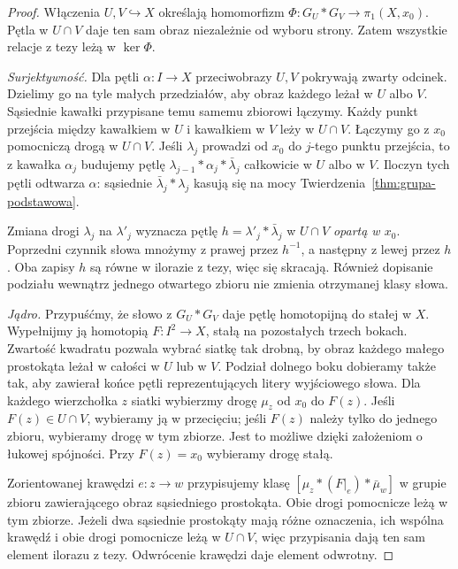 \documentclass[11pt,a4paper,oneside]{report}
\theoremstyle{plain}
\theoremstyle{definition}
\theoremstyle{remark}
\begin{document}
\begin{proof}
Włączenia $U,V\hookrightarrow X$
określają homomorfizm
$\Phi:G_U*G_V\to\pi_1(X,x_0)$.
Pętla w $U\cap V$ daje ten sam obraz
niezależnie od wyboru strony.
Zatem wszystkie relacje z tezy
leżą w $\ker\Phi$.

\emph{Surjektywność.} Dla pętli
$\alpha:I\to X$ przeciwobrazy $U,V$
pokrywają zwarty odcinek. Dzielimy
go na tyle małych przedziałów,
aby obraz każdego leżał w $U$ albo $V$.
Sąsiednie kawałki przypisane temu
samemu zbiorowi łączymy. Każdy
punkt przejścia między kawałkiem
w $U$ i kawałkiem w $V$ leży w
$U\cap V$. Łączymy go z $x_0$
pomocniczą drogą w $U\cap V$.
Jeśli $\lambda_j$ prowadzi od $x_0$
do $j$-tego punktu przejścia,
to z kawałka $\alpha_j$ budujemy
pętlę $\lambda_{j-1}*\alpha_j*
\bar\lambda_j$ całkowicie w $U$
albo w $V$. Iloczyn tych pętli
odtwarza $\alpha$: sąsiednie
$\bar\lambda_j*\lambda_j$
kasują się na mocy
Twierdzenia~\ref{thm:grupa-podstawowa}.

Zmiana drogi $\lambda_j$ na $\lambda'_j$
wyznacza pętlę $h=\lambda'_j*\bar\lambda_j$ w $U\cap V$
\emph{opartą w $x_0$}. Poprzedni czynnik słowa mnożymy z prawej
przez $h^{-1}$, a następny z lewej przez $h$.
Oba zapisy $h$ są równe w ilorazie z tezy, więc się skracają.
Również dopisanie podziału wewnątrz
jednego otwartego zbioru nie zmienia
otrzymanej klasy słowa.

\emph{Jądro.} Przypuśćmy, że słowo
z $G_U*G_V$ daje pętlę homotopijną
do stałej w $X$. Wypełnijmy ją
homotopią $F:I^2\to X$, stałą na
pozostałych trzech bokach.
Zwartość kwadratu pozwala wybrać
siatkę tak drobną, by obraz
każdego małego prostokąta leżał
w całości w $U$ lub w $V$.
Podział dolnego boku dobieramy także tak, aby zawierał końce
pętli reprezentujących litery wyjściowego słowa.
Dla każdego wierzchołka $z$ siatki wybierzmy drogę $\mu_z$
od $x_0$ do $F(z)$. Jeśli $F(z)\in U\cap V$, wybieramy ją
w przecięciu; jeśli $F(z)$ należy tylko do jednego zbioru,
wybieramy drogę w tym zbiorze. Jest to możliwe dzięki założeniom
o łukowej spójności. Przy $F(z)=x_0$ wybieramy drogę stałą.

Zorientowanej krawędzi $e:z\to w$ przypisujemy klasę
$[\mu_z*(F|_e)*\bar\mu_w]$ w grupie zbioru zawierającego
obraz sąsiedniego prostokąta. Obie drogi pomocnicze leżą w tym
zbiorze. Jeżeli dwa sąsiednie prostokąty mają różne oznaczenia,
ich wspólna krawędź i obie drogi pomocnicze leżą w $U\cap V$,
więc przypisania dają ten sam element ilorazu z tezy.
Odwrócenie krawędzi daje element odwrotny.


\end{proof}
\end{document}
